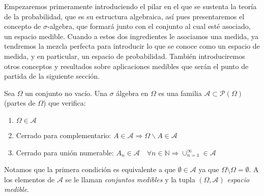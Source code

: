     
    Empezaremos primeramente introduciendo el pilar en el que se sustenta la teoría de la probabilidad, que es su estructura algebraica, así pues presentaremos el concepto de $\sigma$-algebra, que formará junto con el conjunto al cual esté asociado, un espacio medible. Cuando a estos dos ingredientes le asociamos una medida, ya tendremos la mezcla perfecta para introducir lo que se conoce como un espacio de medida, y en particular, un espacio de probabilidad. También introduciremos otros conceptos y resultados sobre aplicaciones medibles que serán el punto de partida de la siguiente sección.
    
       

    \begin{definicion}\label{def:sigma}
        Sea $\Omega$ un conjunto no vacío. Una $\sigma$ álgebra en $\Omega$ es una familia $\mathcal{A} \subset \mathcal{P}(\Omega)$ (partes de $\Omega$) que verifica:
            
        \begin{enumerate}
                \item $\Omega \in \mathcal{A}$ 
                \item Cerrado para complementario: $A \in \mathcal{A} \Rightarrow \Omega\backslash A \in \mathcal{A}$ 
                \item Cerrado para unión numerable: $A_n \in \mathcal{A} \quad \forall n \in \mathbb{N} \Rightarrow \cup^{\infty}_{n=1} \in \mathcal{A}$
        \end{enumerate}
    \end{definicion}
        
    Notamos que la primera condición es equivalente a que $\emptyset \in \mathcal{A}$ ya que $\Omega \setminus \Omega = \emptyset$. A los elementos de $\mathcal{A}$ se le llaman \textit{conjuntos medibles} y la tupla $(\Omega,\mathcal{A})$ \textit{espacio medible}.
    
